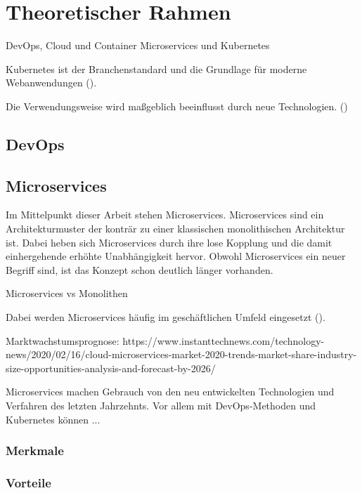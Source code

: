 \section{Theoretischer Rahmen}

DevOps, Cloud und Container Microservices und Kubernetes

Kubernetes ist der Branchenstandard und die Grundlage für moderne Webanwendungen (\cite[Vorwort]{arundelCloud2019}).

Die Verwendungsweise wird maßgeblich beeinflusst durch neue Technologien. (\cite[S. 16]{newmanMicroservices2015})

\subsection{DevOps}

\subsection{Microservices}

Im Mittelpunkt dieser Arbeit stehen Microservices. Microservices sind ein Architekturmuster der konträr zu einer klassischen monolithischen Architektur ist. Dabei heben sich Microservices durch ihre lose Kopplung und die damit einhergehende erhöhte Unabhängigkeit hervor. Obwohl Microservices ein neuer Begriff sind, ist das Konzept schon deutlich länger vorhanden.

Microservices vs Monolithen

Dabei werden Microservices häufig im geschäftlichen Umfeld eingesetzt (\cite[S. 15]{newmanMicroservices2015}). 

Marktwachstumsprognose: https://www.instanttechnews.com/technology-news/2020/02/16/cloud-microservices-market-2020-trends-market-share-industry-size-opportunities-analysis-and-forecast-by-2026/

Microservices machen Gebrauch von den neu entwickelten Technologien und Verfahren des letzten Jahrzehnts. Vor allem mit DevOps-Methoden und Kubernetes können ...

\subsubsection{Merkmale}



\subsubsection{Vorteile}

